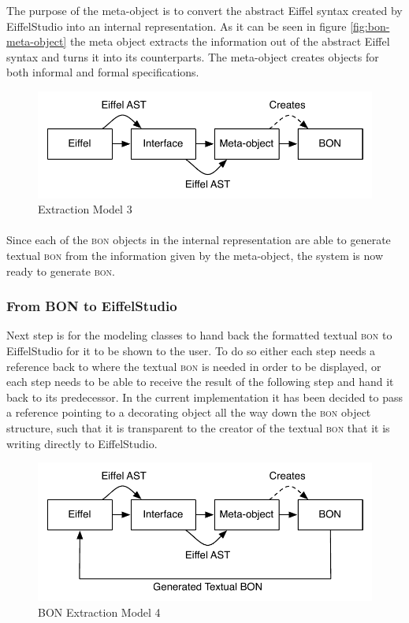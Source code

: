 The purpose of the meta-object is to convert the abstract Eiffel syntax created by EiffelStudio into an internal \bon{} representation. As it can be seen in figure \ref{fig:bon-meta-object} the meta object extracts the information out of the abstract Eiffel syntax and turns it into its \bon{} counterparts. The meta-object creates objects for both informal and formal specifications.

\begin{figure}[H]
\centering
\includegraphics[scale=0.8]{images/BON-extraction-model-3.pdf}
\caption{\bon{} Extraction Model 3}
\label{fig:bon_extraction_3}
\end{figure}

\paragraph{}
Since each of the \textsc{bon} objects in the internal representation are able to generate textual \textsc{bon} from the information given by the meta-object, the system is now ready to generate \textsc{bon}.

\subsubsection{From BON to EiffelStudio}
Next step is for the modeling classes to hand back the formatted textual \textsc{bon} to EiffelStudio for it to be shown to the user. To do so either each step needs a reference back to where the textual \textsc{bon} is needed in order to be displayed, or each step needs to be able to receive the result of the following step and hand it back to its predecessor. In the current implementation it has been decided to pass a reference pointing to a decorating object all the way down the \textsc{bon} object structure, such that it is transparent to the creator of the textual \textsc{bon} that it is writing directly to EiffelStudio.

\begin{figure}[H]
\centering
\includegraphics[scale=0.8]{images/BON-extraction-model-4.pdf}
\caption{BON Extraction Model 4}
\label{fig:bon_extraction_4}
\end{figure}

